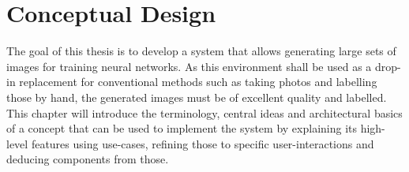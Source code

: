 \chapter{Conceptual Design}
\label{chap:conceptual-design}
The goal of this thesis is to develop a system that allows generating large sets of images for training neural networks. As this environment shall be used as a drop-in replacement for conventional methods such as taking photos and labelling those by hand, the generated images must be of excellent quality and labelled.\\
This chapter will introduce the terminology, central ideas and architectural basics of a concept that can be used to implement the system by explaining its high-level features using use-cases, refining those to specific user-interactions and deducing components from those. 

